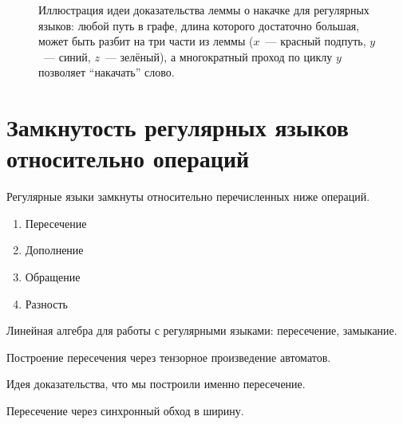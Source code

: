 \begin{figure}
    \caption{Иллюстрация идеи доказательства леммы о накачке для регулярных языков: любой путь в графе, длина которого достаточно большая, может быть разбит на три части из леммы ($x$~--- красный подпуть, $y$~--- синий, $z$~--- зелёный), а многократный проход по циклу $y$ позволяет \enquote{накачать} слово.}
    \label{fig:reg_lang_pumping_lemma}
    \begin{center}
    \end{center}

\end{figure}


\section{Замкнутость регулярных языков относительно операций}

\begin{theorem}
    Регулярные языки замкнуты относительно перечисленных ниже операций.
    \begin{enumerate}
        \item Пересечение
        \item Дополнение
        \item Обращение
        \item Разность
    \end{enumerate}
\end{theorem}

Линейная алгебра для работы с регулярными языками: пересечение, замыкание.

Построение пересечения через тензорное произведение автоматов.

Идея доказательства, что мы построили именно пересечение.

Пересечение через синхронный обход в ширину.

%
%
